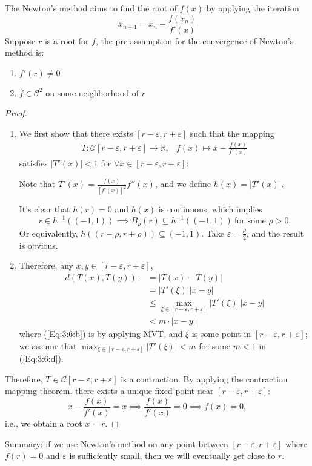\begin{example}
The Newton's method aims to find the root of $f(x)$ by applying the iteration
\[
x_{n+1}=x_n-\frac{f(x_n)}{f'(x)}
\]
Suppose $r$ is a root for $f$, the pre-assumption for the convergence of Newton's method is:
\begin{enumerate}
\item
$f'(r)\ne0$
\item
$f\in\mathcal{C}^2$ on some neighborhood of $r$
\end{enumerate}
\begin{proof}
\begin{enumerate}
\item
We first show that there exists $[r-\varepsilon,r+\varepsilon]$ such that the mapping
\[
\begin{array}{ll}
T:\mathcal{C}[r-\varepsilon,r+\varepsilon]\to\mathbb{R},
&
f(x)\mapsto x-\frac{f(x)}{f'(x)}
\end{array}
\]
satisfies $|T'(x)|<1$ for $\forall x\in[r-\varepsilon,r+\varepsilon]$:

Note that $T'(x)=\frac{f(x)}{[f'(x)]^2}f''(x)$, and we define $h(x)=|T'(x)|$.

It's clear that $h(r)=0$ and $h(x)$ is continuous, which implies
\[
r\in h^{-1}((-1,1))\implies
B_\rho(r)\subseteq h^{-1}((-1,1))\ \text{for some $\rho>0$}.
\]
Or equivalently, $h((r-\rho,r+\rho))\subseteq(-1,1)$. Take $\varepsilon=\frac{\rho}{2}$, and the result is obvious.
\item
Therefore, any $x,y\in [r-\varepsilon,r+\varepsilon]$,
\begin{subequations}
\begin{align}
d(T(x),T(y)):&=|T(x)-T(y)|\label{Eq:3:6:a}\\
&=|T'(\xi)||x-y|\label{Eq:3:6:b}\\
&\le\max_{\xi\in [r-\varepsilon,r+\varepsilon]}|T'(\xi)||x-y|\label{Eq:3:6:c}\\
&<m\cdot|x-y|\label{Eq:3:6:d}
\end{align}
\end{subequations}
where (\ref{Eq:3:6:b}) is by applying MVT, and $\xi$ is some point in $[r-\varepsilon,r+\varepsilon]$; we assume that $\max_{\xi\in [r-\varepsilon,r+\varepsilon]}|T'(\xi)|<m$ for some $m<1$ in (\ref{Eq:3:6:d}).
\end{enumerate}
Therefore, $T\in\mathcal{C}[r-\varepsilon,r+\varepsilon]$ is a contraction. By applying the contraction mapping theorem, there exists a unique fixed point near $[r-\varepsilon,r+\varepsilon]$:
\[
x-\frac{f(x)}{f'(x)}=x\implies\frac{f(x)}{f'(x)}=0\implies f(x)=0,
\]
i.e., we obtain a root $x=r$.
\end{proof}

Summary: if we use Newton's method on any point between $[r-\varepsilon,r+\varepsilon]$ where $f(r)=0$ and $\varepsilon$ is sufficiently small, then we will eventually get close to $r$.
\end{example}

